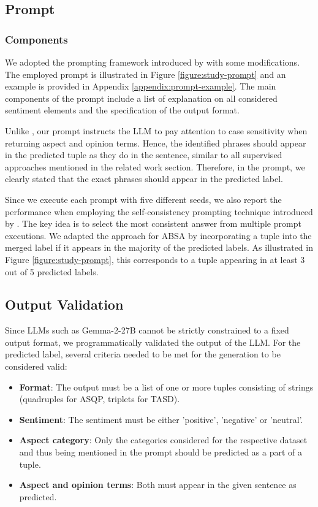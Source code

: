 \subsection{Prompt}

\subsubsection{Components}

We adopted the prompting framework introduced by \citet{gou2023mvp} with some modifications. The employed prompt is illustrated in Figure \ref{figure:study-prompt} and an example is provided in Appendix \ref{appendix:prompt-example}. The main components of the prompt include a list of explanation on all considered sentiment elements and the specification of the output format. 

Unlike \citet{gou2023mvp}, our prompt instructs the LLM to pay attention to case sensitivity when returning aspect and opinion terms. Hence, the identified phrases should appear in the predicted tuple as they do in the sentence, similar to all supervised approaches mentioned in the related work section. Therefore, in the prompt, we clearly stated that the exact phrases should appear in the predicted label. 

Since we execute each prompt with five different seeds, we also report the performance when employing the self-consistency prompting technique introduced by \citet{wang2022self}. The key idea is to select the most consistent answer from multiple prompt executions. We adapted the approach for ABSA by incorporating a tuple into the merged label if it appears in the majority of the predicted labels. As illustrated in Figure \ref{figure:study-prompt}, this corresponds to a tuple appearing in at least 3 out of 5 predicted labels.

\subsection{Output Validation}

Since LLMs such as Gemma-2-27B cannot be strictly constrained to a fixed output format, we programmatically validated the output of the LLM. For the predicted label, several criteria needed to be met for the generation to be considered valid:

\begin{itemize}
    \item \textbf{Format}: The output must be a list of one or more tuples consisting of strings (quadruples for ASQP, triplets for TASD).
    \item \textbf{Sentiment}: The sentiment must be either 'positive', 'negative' or 'neutral'.
    \item \textbf{Aspect category}: Only the categories considered for the respective dataset and thus being mentioned in the prompt should be predicted as a part of a tuple.
    \item \textbf{Aspect and opinion terms}: Both must appear in the given sentence as predicted.
\end{itemize}

